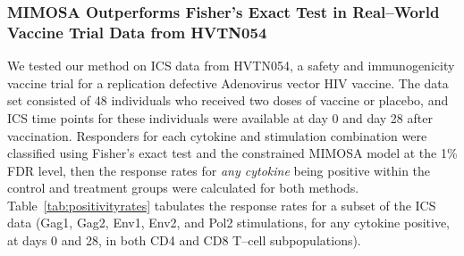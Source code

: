 \documentclass[11pt]{article}
\begin{document}
\subsubsection*{MIMOSA Outperforms Fisher's Exact Test in Real--World Vaccine Trial Data from HVTN054}

We tested our method on ICS data from HVTN054, a safety and immunogenicity vaccine trial for a replication defective Adenovirus vector HIV vaccine. The data set consisted of 48 individuals who received two doses of vaccine or placebo, and ICS time points for these individuals were available at day 0 and day 28 after vaccination. Responders for each cytokine and stimulation combination were classified using Fisher's exact test and the constrained MIMOSA model at the 1\% FDR level, then the response rates for \textit{any cytokine} being positive within the control and treatment groups were calculated for both methods. Table~\ref{tab:positivityrates} tabulates the response rates for a subset of the ICS data (Gag1, Gag2, Env1, Env2, and Pol2 stimulations, for any cytokine positive, at days 0 and 28, in both CD4 and CD8 T--cell subpopulations). 
\end{document}
